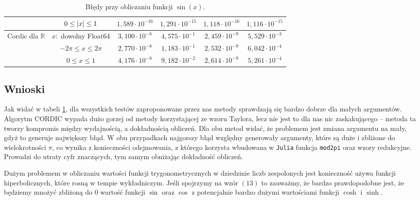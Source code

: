 \documentclass{mwart}
\newcommand{\RR}{\mathbb{R}}
\DeclarePairedDelimiter\abs{\lvert}{\rvert}%
\theoremstyle{remark}
\theoremstyle{definition}
\theoremstyle{definition}
\begin{document}
\begin{table}[H]
{{\begin{tabular}{ |c||c|c|c|c|c| }
          \cline{2-6}
                                                                      & $0 \leq \abs{x} \leq 1$        & $1,589 \cdot 10^{-16}$ & $1,291 \cdot 10^{-15}$ & $1,118 \cdot 10^{-16}$ & $1,116 \cdot 10^{-15}$ \\
          \hline
          \multirow{3}{6em}{Cordic dla $\RR$}                         & $x:$ dowolny Float64           & $3,100 \cdot 10^{-8}$  & $4,575 \cdot 10^{-1}$  & $2,459 \cdot 10^{-9}$  & $5,529 \cdot 10^{-3}$  \\
          \cline{2-6}
                                                                      & $-2\pi \leq x \leq 2\pi$       & $2,770 \cdot 10^{-8}$  & $1,183 \cdot 10^{-1}$  & $2,532 \cdot 10^{-9}$  & $6,042 \cdot 10^{-4}$  \\
          \cline{2-6}
                                                                      & $0 \leq x \leq 1$              & $4,176 \cdot 10^{-8}$  & $9,182 \cdot 10^{-2}$  & $2,614 \cdot 10^{-9}$  & $5,261 \cdot 10^{-4}$  \\
          \hline
        \end{tabular}
      }}
  \caption{Błędy przy obliczaniu funkcji $\sin(x)$.}
  \label{tab:2}
\end{table}

\subsection{Wnioski}
Jak widać w tabeli \ref{tab:2}, dla wszystkich testów zaproponowane przez nas metody sprawdzają 
się bardzo dobrze dla małych argumentów. Algorytm CORDIC wypada dużo gorzej od metody korzystającej 
ze wzoru Taylora, lecz nie jest to dla nas nic zaskakującego -- metoda ta tworzy kompromis 
między wydajnością, a dokładnością obliczeń. Dla obu metod widać, że problemem jest zmiana 
argumentu na mały, gdyż to generuje największy błąd. W obu przypadkach najgorszy błąd względny
generowały argumenty, które są duże i zbliżone do wielokrotności $\pi$, co wynika z konieczności odejmowania, 
z którego korzysta wbudowana w \texttt{Julia} funkcja \texttt{mod2pi} oraz wzory redukcyjne.
Prowadzi do utraty cyfr znaczących, tym samym obniżając dokładność obliczeń.

Dużym problemem w obliczaniu wartości funkcji trygonometrycznych w dziedzinie liczb zespolonych jest konieczność używa funkcji hiperbolicznych, które rosną w tempie wykładniczym. Jeśli spojrzymy na wzór $(13)$ to zauważmy, że bardzo prawdopodobne jest, że będziemy mnożyć zbliżoną do $0$ wartość funkcji $\sin$ oraz $\cos$ z potencjalnie bardzo dużymi wartościami funkcji $\cosh$ i $\sinh$. 
\end{document}
